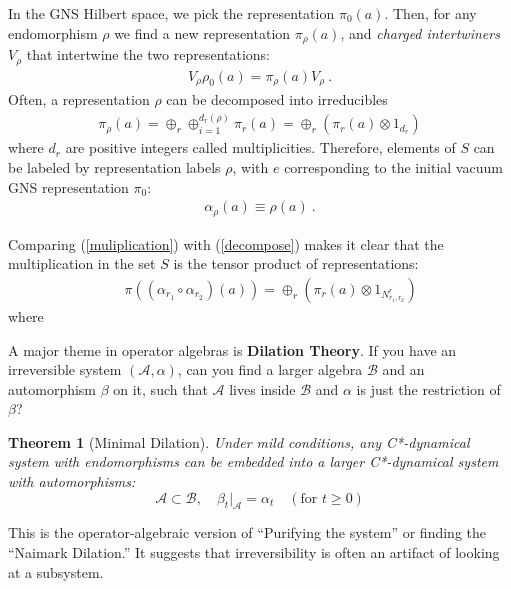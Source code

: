 \documentclass{article}
\newtheorem{theorem}{Theorem}
\theoremstyle{definition}
\begin{document}
  In the GNS Hilbert space, we pick the representation $\pi_{0}(a)$. Then, for any
  endomorphism $\rho$ we find a new representation $\pi_{\rho}(a)$, and
  {\it charged intertwiners} $V_{\rho}$ that intertwine the two representations:
  \begin{eqnarray}
    V_\rho \rho_0(a)=\pi_\rho(a) V_\rho\ .
  \end{eqnarray}
  Often, a representation $\rho$ can be decomposed into irreducibles
  \begin{eqnarray}
    \label{decompose} \pi_\rho(a)=\oplus_r \oplus_{i=1}^{d_r(\rho)}\pi_r(a)=\oplus_r
    (\pi_r(a)\otimes 1_{d_r})
  \end{eqnarray}
  where $d_{r}$ are positive integers called multiplicities. Therefore, elements
  of $S$ can be labeled by representation labels $\rho$, with $e$ corresponding to
  the initial vacuum GNS representation $\pi_{0}$:
  \begin{eqnarray}
    \alpha_\rho(a)\equiv \rho(a)\ .
  \end{eqnarray}

  Comparing (\ref{muliplication}) with (\ref{decompose}) makes it clear that the
  multiplication in the set $S$ is the tensor product of representations:
  \begin{eqnarray}
    && \pi((\alpha_{r_1}\circ\alpha_{r_2})(a))=\oplus_r (\pi_r(a)\otimes 1_{N^r_{r_1,r_2}})
  \end{eqnarray}
  where

  A major theme in operator algebras is \textbf{Dilation Theory}. If you have an
  irreversible system $(\mathcal{A}, \alpha)$, can you find a larger algebra
  $\mathcal{B}$ and an automorphism $\beta$ on it, such that $\mathcal{A}$ lives
  inside $\mathcal{B}$ and $\alpha$ is just the restriction of $\beta$?

  \begin{theorem}[Minimal Dilation]
    Under mild conditions, any C*-dynamical system with endomorphisms can be embedded
    into a larger C*-dynamical system with automorphisms:
    \begin{equation}
      \mathcal{A}\subset \mathcal{B}, \quad \beta_{t}|_{\mathcal{A}}= \alpha_{t}\quad
      (\text{for }t \ge 0)
    \end{equation}
  \end{theorem}

  This is the operator-algebraic version of ``Purifying the system'' or finding
  the ``Naimark Dilation.'' It suggests that irreversibility is often an artifact
  of looking at a subsystem.
\end{document}
